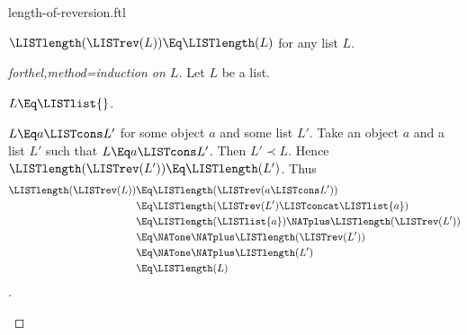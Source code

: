 \documentclass{stex}
\begin{document}
\begin{smodule}{length-of-reversion.ftl}

\begin{proposition}[forthel,id=LISTS_LENGTHREV_4512036658964875]
  $\LISTlength(\LISTrev(L)) \Eq \LISTlength(L)$ for any list $L$.
\end{proposition}
\begin{proof}[forthel,method=induction on $L$]
  Let $L$ be a list.
  
  \begin{case}{$L \Eq \LISTlist{}$.}\end{case}
  
  \begin{case}{$L \Eq a \LISTcons L'$ for some object $a$ and some list $L'$.}
    Take an object $a$ and a list $L'$ such that $L \Eq a \LISTcons L'$.
    Then $L' \prec L$.
    Hence $\LISTlength(\LISTrev(L')) \Eq \LISTlength(L')$.
    Thus
    \begin{align*}
      \LISTlength(\LISTrev(L))
        &\Eq \LISTlength(\LISTrev(a \LISTcons L'))\\
        &\Eq \LISTlength(\LISTrev(L') \LISTconcat \LISTlist{a})\\
        &\Eq \LISTlength(\LISTlist{a}) \NATplus \LISTlength(\LISTrev(L'))\\
        &\Eq \NATone \NATplus \LISTlength(\LISTrev(L'))\\
        &\Eq \NATone \NATplus \LISTlength(L')\\
        &\Eq \LISTlength(L)
    \end{align*}.
  \end{case}
\end{proof}
\end{smodule}
\end{document}
